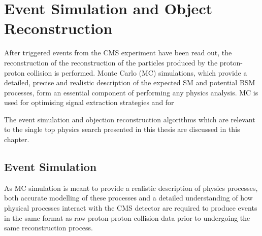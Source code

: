 \chapter{Event Simulation and Object Reconstruction}\label{chapter:data-mc}
After triggered events from the CMS experiment have been read out, the reconstruction of the reconstruction of the particles produced by the proton-proton collision is performed.
Monte Carlo (MC) simulations, which provide a detailed, precise and realistic description of the expected SM and potential BSM processes, form an essential component of performing any physics analysis.
MC is used for optimising signal extraction strategies and for 

 
The event simulation and objection reconstruction algorithms which are relevant to the single top physics search presented in this thesis are discussed in this chapter.

\section{Event Simulation}\label{sec:sim}
As MC simulation is meant to provide a realistic description of physics processes, both accurate modelling of these processes and a detailed understanding of how physical processes interact with the CMS detector are required to produce events in the same format as raw proton-proton collision data prior to undergoing the same reconstruction process.


%
%
%
%
%
%
%
%
%
%

